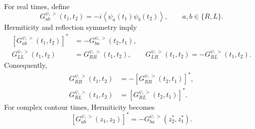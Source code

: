 \documentclass[11pt,a4paper]{article}
\begin{document}
For real times, define
\begin{equation}
G^{\psi,>}_{ab}(t_1,t_2)
=
-i\left\langle
\psi_a(t_1)\psi_b(t_2)
\right\rangle,
\qquad
a,b\in\{R,L\}.
\label{eq:S6-Wightman-definition}
\end{equation}
Hermiticity and reflection symmetry imply
\begin{equation}
\begin{aligned}
\left[
G^{\psi,>}_{ab}(t_1,t_2)
\right]^*
&=
-G^{\psi,>}_{ba}(t_2,t_1),
\\
G^{\psi,>}_{LL}(t_1,t_2)
&=
G^{\psi,>}_{RR}(t_1,t_2),
\qquad
G^{\psi,>}_{LR}(t_1,t_2)
=
-G^{\psi,>}_{RL}(t_1,t_2).
\end{aligned}
\label{eq:S6-Wightman-symmetries}
\end{equation}
Consequently,
\begin{equation}
\begin{aligned}
G^{\psi,>}_{RR}(t_1,t_2)
&=
-\left[
G^{\psi,>}_{RR}(t_2,t_1)
\right]^*,
\\
G^{\psi,>}_{RL}(t_1,t_2)
&=
\left[
G^{\psi,>}_{RL}(t_2,t_1)
\right]^* .
\end{aligned}
\label{eq:S6-independent-components}
\end{equation}
For complex contour times, Hermiticity becomes
\begin{equation}
\left[
G^{\psi,>}_{ab}(z_1,z_2)
\right]^*
=
-G^{\psi,>}_{ba}(z_2^*,z_1^*) .
\label{eq:S6-complex-Wightman-conjugation}
\end{equation}
\end{document}
